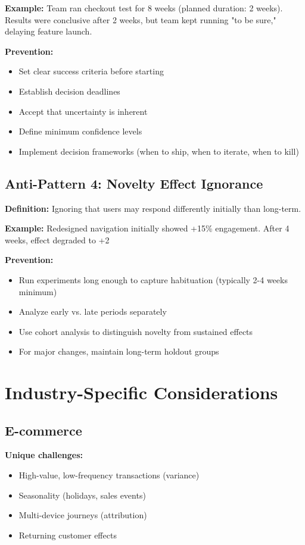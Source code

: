\textbf{Example:} Team ran checkout test for 8 weeks (planned duration: 2 weeks). Results were conclusive after 2 weeks, but team kept running "to be sure," delaying feature launch.

\textbf{Prevention:}
\begin{itemize}
    \item Set clear success criteria before starting
    \item Establish decision deadlines
    \item Accept that uncertainty is inherent
    \item Define minimum confidence levels
    \item Implement decision frameworks (when to ship, when to iterate, when to kill)
\end{itemize}

\subsection{Anti-Pattern 4: Novelty Effect Ignorance}

\textbf{Definition:} Ignoring that users may respond differently initially than long-term.

\textbf{Example:} Redesigned navigation initially showed +15\% engagement. After 4 weeks, effect degraded to +2%

\textbf{Prevention:}
\begin{itemize}
    \item Run experiments long enough to capture habituation (typically 2-4 weeks minimum)
    \item Analyze early vs. late periods separately
    \item Use cohort analysis to distinguish novelty from sustained effects
    \item For major changes, maintain long-term holdout groups
\end{itemize}

\section{Industry-Specific Considerations}

\subsection{E-commerce}

\textbf{Unique challenges:}
\begin{itemize}
    \item High-value, low-frequency transactions (variance)
    \item Seasonality (holidays, sales events)
    \item Multi-device journeys (attribution)
    \item Returning customer effects
\end{itemize}

